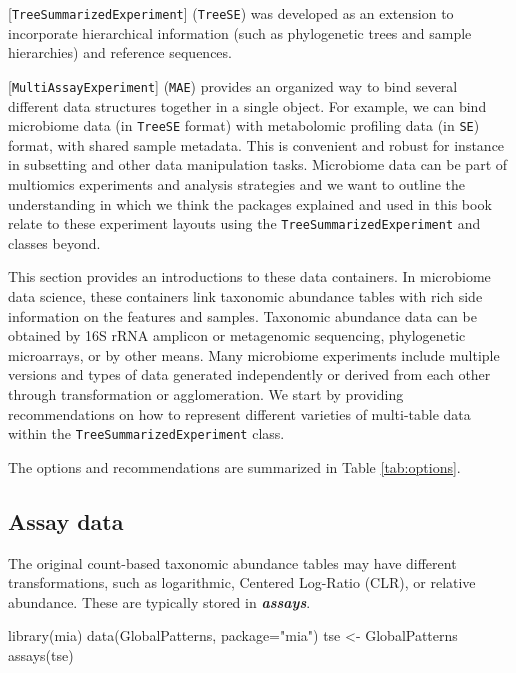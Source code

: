 \documentclass[
]{book}
\newenvironment{Shaded}{\begin{snugshade}}{\end{snugshade}}
\newcommand{\AttributeTok}[1]{\textcolor[rgb]{0.77,0.63,0.00}{#1}}
\newcommand{\FunctionTok}[1]{\textcolor[rgb]{0.00,0.00,0.00}{#1}}
\newcommand{\NormalTok}[1]{#1}
\newcommand{\OtherTok}[1]{\textcolor[rgb]{0.56,0.35,0.01}{#1}}
\newcommand{\StringTok}[1]{\textcolor[rgb]{0.31,0.60,0.02}{#1}}
\begin{document}
{[}\texttt{TreeSummarizedExperiment}{]} (\texttt{TreeSE}) \citep{R-TreeSummarizedExperiment} was developed as an extension to incorporate hierarchical
information (such as phylogenetic trees and sample hierarchies) and
reference sequences.

{[}\texttt{MultiAssayExperiment}{]} (\texttt{MAE}) \citep{Ramos2017} provides an organized way to bind several different data
structures together in a single object. For example, we can bind
microbiome data (in \texttt{TreeSE} format) with metabolomic profiling data
(in \texttt{SE}) format, with shared sample metadata. This is convenient and
robust for instance in subsetting and other data manipulation
tasks. Microbiome data can be part of multiomics experiments and
analysis strategies and we want to outline the understanding in which
we think the packages explained and used in this book relate to these
experiment layouts using the \texttt{TreeSummarizedExperiment} and classes
beyond.

This section provides an introductions to these data containers. In
microbiome data science, these containers link taxonomic abundance
tables with rich side information on the features and
samples. Taxonomic abundance data can be obtained by 16S rRNA amplicon
or metagenomic sequencing, phylogenetic microarrays, or by other
means. Many microbiome experiments include multiple versions and types
of data generated independently or derived from each other through
transformation or agglomeration. We start by providing recommendations
on how to represent different varieties of multi-table data within the
\texttt{TreeSummarizedExperiment} class.

The options and recommendations are summarized in Table \ref{tab:options}.

\hypertarget{assay-data}{%
\subsection{Assay data}\label{assay-data}}

The original count-based taxonomic abundance tables may have different
transformations, such as logarithmic, Centered Log-Ratio (CLR), or relative
abundance. These are typically stored in \emph{\textbf{assays}}.

\begin{Shaded}
\begin{Highlighting}[]
\FunctionTok{library}\NormalTok{(mia)}
\FunctionTok{data}\NormalTok{(GlobalPatterns, }\AttributeTok{package=}\StringTok{"mia"}\NormalTok{)}
\NormalTok{tse }\OtherTok{\textless{}{-}}\NormalTok{ GlobalPatterns}
\FunctionTok{assays}\NormalTok{(tse)}
\end{Highlighting}
\end{Shaded}
\end{document}
